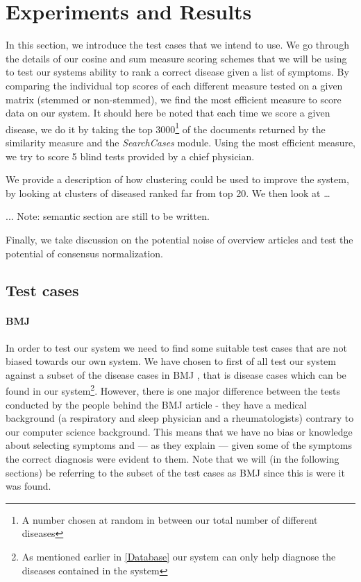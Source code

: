 \chapter{Experiments and Results\label{ExperimentsResults}}

In this section, we introduce the test cases that we intend to use. We
go through the details of our cosine and sum measure scoring schemes
that we will be using to test our systems ability to rank a correct
disease given a list of symptoms. By comparing the individual top
scores of each different measure tested on a given matrix (stemmed or
non-stemmed), we find the most efficient measure to score data on our
system. It should here be noted that each time we score a given
disease, we do it by taking the top 3000\footnote{A number chosen at
  random in between our total number of different diseases} of the
documents returned by the similarity measure and the
\textit{SearchCases} module. Using the most efficient measure, we try
to score 5 blind tests provided by a chief physician.

We provide a description of how clustering could be used to improve
the system, by looking at clusters of diseased ranked far from top
20. We then look at \ldots

 ... Note: semantic section are still to be written.

Finally, we take discussion on the potential noise of overview
articles and test the potential of consensus normalization.

\section{Test cases}

\subsubsection{BMJ}
In order to test our system we need to find some suitable test cases
that are not biased towards our own system. We have chosen to first of
all test our system against a subset of the disease cases in BMJ
\cite{HangwiTang11102006}, that is disease cases which can be found in
our system\footnote{As mentioned earlier in \ref{Database} our system
  can only help diagnose the diseases contained in the
  system}. However, there is one major difference between the tests
conducted by the people behind the BMJ article - they have a medical
background (a respiratory and sleep physician and a rheumatologists)
contrary to our computer science background. This means that we have
no bias or knowledge about selecting symptoms and --- as they explain ---
given some of the symptoms the correct diagnosis were evident to
them. Note that we will (in the following sections) be referring to
the subset of the test cases as BMJ since this is were it was
found.

